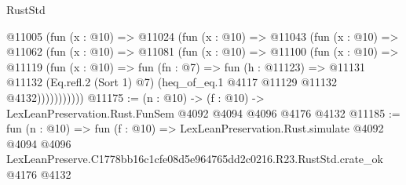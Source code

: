 \begin{lexlean}{RustStd}
\begin{coremodule}
        @11005
          (fun (x : @10) =>
          @11024
            (fun (x : @10) =>
            @11043
              (fun (x : @10) =>
              @11062
                (fun (x : @10) =>
                @11081
                  (fun (x : @10) =>
                  @11100
                    (fun (x : @10) =>
                    @11119
                      (fun (x : @10) =>
                      fun (fn : @7) =>
                      fun (h : @11123) =>
                      @11131
                        @11132
                        (Eq.refl.{2} (Sort 1) @7)
                        (heq_of_eq.{1} @4117 @11129 @11132 @4132)))))))))))
@11175 := (n : @10) -> (f : @10) -> LexLeanPreservation.Rust.FunSem @4092 @4094 @4096 @4176 @4132
@11185 := fun (n : @10) =>
  fun (f : @10) =>
  LexLeanPreservation.Rust.simulate
    @4092
    @4094
    @4096
    LexLeanPreserve.C1778bb16c1cfe08d5e964765dd2c0216.R23.RustStd.crate_ok
    @4176
    @4132
\end{coremodule}
\end{lexlean}
